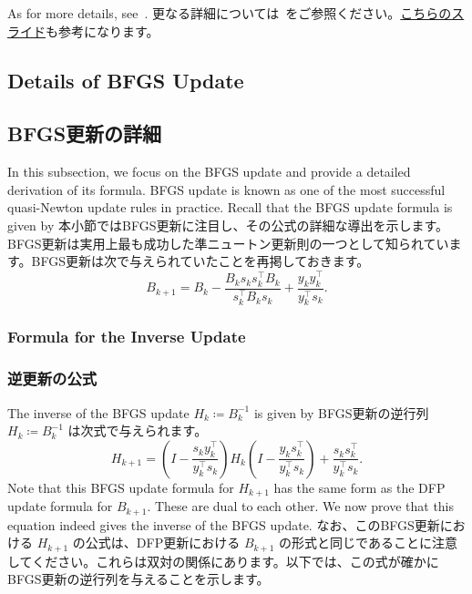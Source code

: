 \documentclass[0_main]{subfiles}
\begin{document}
\ifEn
    As for more details, see~\citep{kanamoriBregmanExtensionQuasiNewton2010,kanamoriBregmanExtensionQuasiNewton2010a}.
\else
    更なる詳細については~\citep{kanamoriBregmanExtensionQuasiNewton2010,kanamoriBregmanExtensionQuasiNewton2010a}をご参照ください。\href{http://matsuzoe.web.nitech.ac.jp/infogeo/OCAMI2010/kanamori.pdf}{こちらのスライド}も参考になります。
\fi

\ifEn
    \subsection{Details of BFGS Update}
\else
    \subsection{BFGS更新の詳細}
\fi

\ifEn
    In this subsection, we focus on the BFGS update and provide a detailed derivation of its formula. BFGS update is known as one of the most successful quasi-Newton update rules in practice. Recall that the BFGS update formula is given by
\else
    本小節ではBFGS更新に注目し、その公式の詳細な導出を示します。BFGS更新は実用上最も成功した準ニュートン更新則の一つとして知られています。BFGS更新は次で与えられていたことを再掲しておきます。
\fi
\begin{equation*}
    B_{k+1}   = B_k - \frac{B_k s_k s_k^\top B_k}{s_k^\top B_k s_k} + \frac{y_k y_k^\top}{y_k^\top s_k}.
\end{equation*}

\ifEn
    \subsubsection{Formula for the Inverse Update}
\else
    \subsubsection{逆更新の公式}
\fi

\ifEn
    The inverse of the BFGS update $H_k \coloneqq B_k^{-1}$ is given by
\else
    BFGS更新の逆行列 $H_k \coloneqq B_k^{-1}$ は次式で与えられます。
\fi
\begin{equation*}
    H_{k+1} = \left(I - \frac{s_k y_k^\top}{y_k^\top s_k}\right) H_k \left(I - \frac{y_k s_k^\top}{y_k^\top s_k}\right) + \frac{s_k s_k^\top}{y_k^\top s_k}.
\end{equation*}
\ifEn
    Note that this BFGS update formula for $H_{k+1}$ has the same form as the DFP update formula for $B_{k+1}$. These are dual to each other. We now prove that this equation indeed gives the inverse of the BFGS update.
\else
    なお、このBFGS更新における $H_{k+1}$ の公式は、DFP更新における $B_{k+1}$ の形式と同じであることに注意してください。これらは双対の関係にあります。以下では、この式が確かにBFGS更新の逆行列を与えることを示します。
\fi
\end{document}
